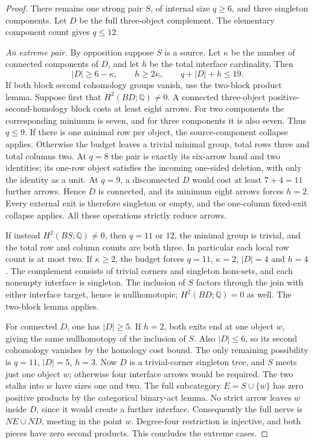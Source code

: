 \begin{proof}
There remains one strong pair $S$, of internal size $q\ge6$, and
three singleton components. Let $D$ be the full three-object complement.
The elementary component count gives $q\le12$.

\emph{An extreme pair.} By opposition suppose $S$ is a source.
Let $\kappa$ be the number of connected components of $D$, and let
$h$ be the total interface cardinality. Then
\[
 |D|\ge6-\kappa,\qquad h\ge2\kappa,\qquad q+|D|+h\le19.
\]
If both block second cohomology groups vanish, use the two-block
product lemma. Suppose first that $H^2(BD;\mathbb Q)\ne0$.
A connected three-object positive-second-homology block costs at
least eight arrows. For two components the corresponding minimum
is seven, and for three components it is also seven. Thus $q\le9$.
If there is one minimal row per object, the source-component
collapse applies. Otherwise the budget leaves a trivial minimal
group, total rows three and total columns two. At $q=8$ the pair
is exactly its six-arrow band and two identities; its one-row
object satisfies the incoming one-sided deletion, with only the
identity as a unit. At $q=9$, a disconnected $D$ would cost at
least $7+4=11$ further arrows. Hence $D$ is connected, and its
minimum eight arrows forces $h=2$. Every external exit is therefore
singleton or empty, and the one-column fixed-exit collapse applies.
All these operations strictly reduce arrows.

If instead $H^2(BS;\mathbb Q)\ne0$, then $q=11$ or $12$,
the minimal group is trivial, and the total row and column counts
are both three. In particular each local row count is at most two.
If $\kappa\ge2$, the budget forces $q=11$, $\kappa=2$,
$|D|=4$ and $h=4$. The complement consists of trivial corners
and singleton hom-sets, and each nonempty interface is singleton.
The inclusion of $S$ factors through the join with either interface
target, hence is nullhomotopic; $H^2(BD;\mathbb Q)=0$ as well.
The two-block lemma applies.

For connected $D$, one has $|D|\ge5$. If $h=2$, both exits end
at one object $w$, giving the same nullhomotopy of the inclusion
of $S$. Also $|D|\le6$, so its second cohomology vanishes by
the homology cost bound. The only remaining possibility is
$q=11$, $|D|=5$, $h=3$. Now $D$ is a trivial-corner singleton
tree, and $S$ meets just one object $w$; otherwise four interface
arrows would be required. The two stalks into $w$ have sizes one
and two. The full subcategory $E=S\cup\{w\}$ has zero positive
products by the categorical binary-act lemma. No strict arrow
leaves $w$ inside $D$, since it would create a further interface.
Consequently the full nerve is $NE\cup ND$, meeting in the point
$w$. Degree-four restriction is injective, and both pieces have
zero second products. This concludes the extreme cases.


\end{proof}
